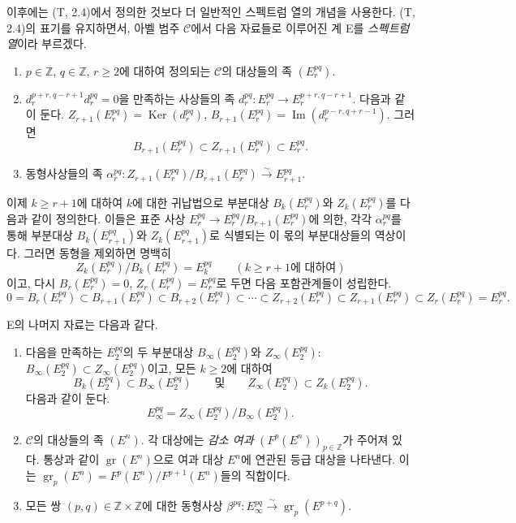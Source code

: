 \begin{env}[11.1.1]
\label{0.11.1.1-fr}
이후에는 (T, 2.4)에서 정의한 것보다 더 일반적인 스펙트럼 열의 개념을
사용한다. (T, 2.4)의 표기를 유지하면서, 아벨 범주 $\mathcal C$에서
다음 자료들로 이루어진 계 E를 \emph{스펙트럼 열}이라 부르겠다.
\begin{enumerate}
  \item[(a)] $p\in\mathbb Z$, $q\in\mathbb Z$, $r\geq2$에 대하여
    정의되는 $\mathcal C$의 대상들의 족 $(E_r^{pq})$.
  \item[(b)]
    $d_r^{p+r,q-r+1}d_r^{pq}=0$을 만족하는 사상들의 족
    $d_r^{pq}:E_r^{pq}\to E_r^{p+r,q-r+1}$. 다음과 같이 둔다.
    $Z_{r+1}(E_r^{pq})=\operatorname{Ker}(d_r^{pq})$,
    $B_{r+1}(E_r^{pq})=\operatorname{Im}(d_r^{p-r,q+r-1})$. 그러면
    \[
      B_{r+1}(E_r^{pq})\subset Z_{r+1}(E_r^{pq})\subset E_r^{pq}.
    \]
  \item[(c)] 동형사상들의 족
    $\alpha_r^{pq}:Z_{r+1}(E_r^{pq})/B_{r+1}(E_r^{pq})
    \xrightarrow{\sim}E_{r+1}^{pq}$.
\end{enumerate}

이제 $k\geq r+1$에 대하여 $k$에 대한 귀납법으로 부분대상
$B_k(E_r^{pq})$와 $Z_k(E_r^{pq})$를 다음과 같이 정의한다. 이들은
표준 사상 $E_r^{pq}\to E_r^{pq}/B_{r+1}(E_r^{pq})$에 의한, 각각
$\alpha_r^{pq}$를 통해 부분대상 $B_k(E_{r+1}^{pq})$와
$Z_k(E_{r+1}^{pq})$로 식별되는 이 몫의 부분대상들의 역상이다. 그러면
동형을 제외하면 명백히
\[
\label{0.11.1.1.1-fr}
  Z_k(E_r^{pq})/B_k(E_r^{pq})=E_k^{pq}
  \qquad(k\geq r+1\text{에 대하여})
  \tag{11.1.1.1}
\]
이고, 다시 $B_r(E_r^{pq})=0$, $Z_r(E_r^{pq})=E_r^{pq}$로 두면 다음
포함관계들이 성립한다.
\[
\label{0.11.1.1.2-fr}
  0=B_r(E_r^{pq})\subset B_{r+1}(E_r^{pq})\subset B_{r+2}(E_r^{pq})
  \subset\cdots\subset Z_{r+2}(E_r^{pq})\subset Z_{r+1}(E_r^{pq})
  \subset Z_r(E_r^{pq})=E_r^{pq}.
  \tag{11.1.1.2}
\]

E의 나머지 자료는 다음과 같다.
\begin{enumerate}
  \item[(d)] 다음을 만족하는 $E_2^{pq}$의 두 부분대상
    $B_\infty(E_2^{pq})$와 $Z_\infty(E_2^{pq})$:
    $B_\infty(E_2^{pq})\subset Z_\infty(E_2^{pq})$이고, 모든
    $k\geq2$에 대하여
    \[
      B_k(E_2^{pq})\subset B_\infty(E_2^{pq})
      \qquad\text{및}\qquad
      Z_\infty(E_2^{pq})\subset Z_k(E_2^{pq}).
    \]
    다음과 같이 둔다.
    \[
    \label{0.11.1.1.3-fr}
      E_\infty^{pq}=Z_\infty(E_2^{pq})/B_\infty(E_2^{pq}).
      \tag{11.1.1.3}
    \]
  \item[(e)]
    $\mathcal C$의 대상들의 족 $(E^n)$. 각 대상에는 \emph{감소 여과}
    $(F^p(E^n))_{p\in\mathbb Z}$가 주어져 있다. 통상과 같이
    $\operatorname{gr}(E^n)$으로 여과 대상 $E^n$에 연관된 등급 대상을
    나타낸다. 이는
    $\operatorname{gr}_p(E^n)=F^p(E^n)/F^{p+1}(E^n)$들의 직합이다.
  \item[(f)] 모든 쌍 $(p,q)\in\mathbb Z\times\mathbb Z$에 대한 동형사상
    $\beta^{pq}:E_\infty^{pq}\xrightarrow{\sim}
    \operatorname{gr}_p(E^{p+q})$.
\end{enumerate}


\end{env}
